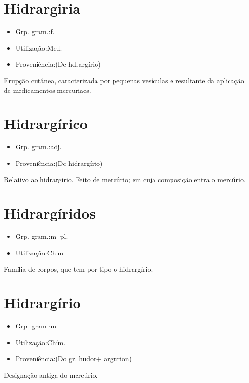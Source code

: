 \documentclass{article}
\begin{document}
\section{Hidrargiria}
\begin{itemize}
\item {Grp. gram.:f.}
\end{itemize}
\begin{itemize}
\item {Utilização:Med.}
\end{itemize}
\begin{itemize}
\item {Proveniência:(De \textunderscore hdrargírio\textunderscore )}
\end{itemize}
Erupção cutânea, caracterizada por pequenas vesículas e resultante da aplicação de medicamentos mercuriaes.
\section{Hidrargírico}
\begin{itemize}
\item {Grp. gram.:adj.}
\end{itemize}
\begin{itemize}
\item {Proveniência:(De \textunderscore hidrargírio\textunderscore )}
\end{itemize}
Relativo ao hidrargirio.
Feito de mercúrio; em cuja composição entra o mercúrio.
\section{Hidrargíridos}
\begin{itemize}
\item {Grp. gram.:m. pl.}
\end{itemize}
\begin{itemize}
\item {Utilização:Chím.}
\end{itemize}
Família de corpos, que tem por tipo o hidrargírio.
\section{Hidrargírio}
\begin{itemize}
\item {Grp. gram.:m.}
\end{itemize}
\begin{itemize}
\item {Utilização:Chím.}
\end{itemize}
\begin{itemize}
\item {Proveniência:(Do gr. \textunderscore hudor\textunderscore  + \textunderscore argurion\textunderscore )}
\end{itemize}
Designação antiga do mercúrio.
\end{document}
